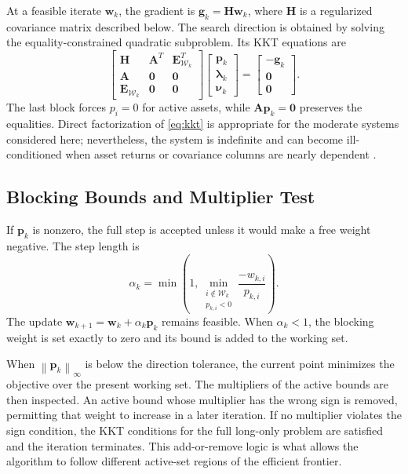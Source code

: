 \documentclass[conference]{IEEEtran}
\newcommand{\vect}[1]{\boldsymbol{#1}}
\newcommand{\mat}[1]{\boldsymbol{#1}}
\newcommand{\norm}[1]{\left\lVert #1 \right\rVert}
\begin{document}
At a feasible iterate $\vect{w}_k$, the gradient is
$\vect{g}_k=\mat{H}\vect{w}_k$, where $\mat{H}$ is a regularized covariance
matrix described below. The search direction is obtained by solving the
equality-constrained quadratic subproblem. Its KKT equations are
\begin{equation}
\begin{bmatrix}
\mat{H} & \mat{A}^{T} & \mat{E}_{\mathcal{W}_k}^{T}\\
\mat{A} & \mat{0} & \mat{0}\\
\mat{E}_{\mathcal{W}_k} & \mat{0} & \mat{0}
\end{bmatrix}
\begin{bmatrix}
\vect{p}_k\\\vect{\lambda}_k\\\vect{\nu}_k
\end{bmatrix}
=
\begin{bmatrix}
-\vect{g}_k\\\vect{0}\\\vect{0}
\end{bmatrix}.
\label{eq:kkt}
\end{equation}
The last block forces $p_i=0$ for active assets, while
$\mat{A}\vect{p}_k=\vect{0}$ preserves the equalities. Direct factorization of
\eqref{eq:kkt} is appropriate for the moderate systems considered here;
nevertheless, the system is indefinite and can become ill-conditioned when
asset returns or covariance columns are nearly dependent \cite{golub2013}.

\subsection{Blocking Bounds and Multiplier Test}

If $\vect{p}_k$ is nonzero, the full step is accepted unless it would make a
free weight negative. The step length is
\begin{equation}
 \alpha_k=\min\left(1,
   \min_{\substack{i\notin\mathcal{W}_k\\p_{k,i}<0}}
   \frac{-w_{k,i}}{p_{k,i}}\right).
 \label{eq:step}
\end{equation}
The update $\vect{w}_{k+1}=\vect{w}_k+\alpha_k\vect{p}_k$ remains feasible.
When $\alpha_k<1$, the blocking weight is set exactly to zero and its bound is
added to the working set.

When $\norm{\vect{p}_k}_{\infty}$ is below the direction tolerance, the current
point minimizes the objective over the present working set. The multipliers of
the active bounds are then inspected. An active bound whose multiplier has the
wrong sign is removed, permitting that weight to increase in a later
iteration. If no multiplier violates the sign condition, the KKT conditions
for the full long-only problem are satisfied and the iteration terminates.
This add-or-remove logic is what allows the algorithm to follow different
active-set regions of the efficient frontier.
\end{document}
